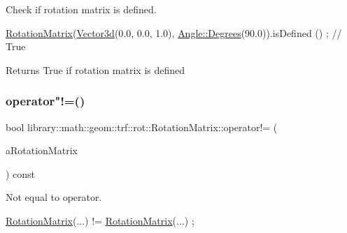 Check if rotation matrix is defined. 


\begin{DoxyCode}
\hyperlink{classlibrary_1_1math_1_1geom_1_1trf_1_1rot_1_1_rotation_matrix_a667d2c05aa5b0cc88775938d11164cdc}{RotationMatrix}(\hyperlink{namespacelibrary_1_1math_1_1obj_a977e84e9bf317a4e7dd9d6d671d6da2f}{Vector3d}(0.0, 0.0, 1.0), \hyperlink{classlibrary_1_1math_1_1geom_1_1_angle_a64aa53e8420aeb6f671d86c65c370bc8}{Angle::Degrees}(90.0)).isDefined
      () ; \textcolor{comment}{// True}
\end{DoxyCode}


\begin{DoxyReturn}{Returns}
True if rotation matrix is defined 
\end{DoxyReturn}
\mbox{\label{classlibrary_1_1math_1_1geom_1_1trf_1_1rot_1_1_rotation_matrix_a28996f6b0def32867b58931e1c804b4f}} 
\subsubsection{\texorpdfstring{operator"!=()}{operator!=()}}
{\footnotesize\ttfamily bool library\+::math\+::geom\+::trf\+::rot\+::\+Rotation\+Matrix\+::operator!= (\begin{DoxyParamCaption}\item[{const \hyperlink{classlibrary_1_1math_1_1geom_1_1trf_1_1rot_1_1_rotation_matrix}{Rotation\+Matrix} \&}]{a\+Rotation\+Matrix }\end{DoxyParamCaption}) const}



Not equal to operator. 


\begin{DoxyCode}
\hyperlink{classlibrary_1_1math_1_1geom_1_1trf_1_1rot_1_1_rotation_matrix_a667d2c05aa5b0cc88775938d11164cdc}{RotationMatrix}(...) != \hyperlink{classlibrary_1_1math_1_1geom_1_1trf_1_1rot_1_1_rotation_matrix_a667d2c05aa5b0cc88775938d11164cdc}{RotationMatrix}(...) ;
\end{DoxyCode}




